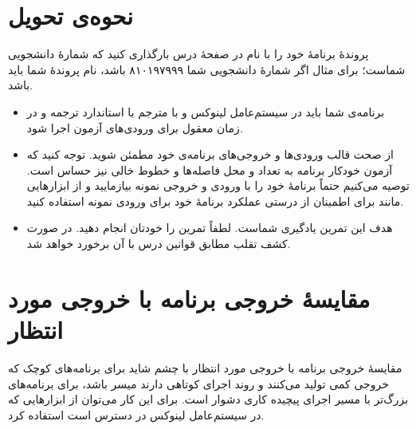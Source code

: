\documentclass{utap}
\begin{document}
    \begin{latin}
    \begin{figure}
    \centering
    {\fontsize{4.4}{4.4} \selectfont
    }
    \end{figure}
    \end{latin}

    \clearpage
    
    \section{نحوه‌ی تحویل}

    پروندهٔ برنامهٔ خود را با نام  در صفحهٔ  درس بارگذاری کنید که  شمارهٔ دانشجویی شماست؛ برای مثال اگر شمارهٔ دانشجویی شما ۸۱۰۱۹۷۹۹۹ باشد، نام پروندهٔ شما باید  باشد.

    \begin{itemize}
        \item برنامه‌ی شما باید در سیستم‌عامل لینوکس و با مترجم  با استاندارد  ترجمه و در زمان معقول برای ورودی‌های آزمون اجرا شود.
        \item از صحت قالب ورودی‌ها و خروجی‌های برنامه‌ی خود مطمئن شوید. توجه کنید که آزمون خودکار برنامه به تعداد و محل فاصله‌ها و خطوط خالی نیز حساس است. توصیه می‌کنیم حتماً برنامهٔ خود را با ورودی و خروجی نمونه بیازمایید و از ابزارهایی مانند  برای اطمینان از درستی عملکرد برنامهٔ خود برای ورودی نمونه استفاده کنید.
        \item هدف این تمرین یادگیری شماست. لطفاً تمرین را خودتان انجام دهید. در صورت کشف تقلب مطابق قوانین درس با آن برخورد خواهد شد.
    \end{itemize}

    \appendix

    \section{مقایسهٔ خروجی برنامه با خروجی مورد انتظار\label{sec:diff}}

    مقایسهٔ خروجی برنامه با خروجی مورد انتظار با چشم شاید برای برنامه‌های کوچک که خروجی کمی تولید می‌کنند و روند اجرای کوتاهی دارند میسر باشد، برای برنامه‌های بزرگ‌تر با مسیر اجرای پیچیده کاری دشوار است. برای این کار می‌توان از ابزارهایی که در سیستم‌عامل لینوکس در دسترس است استفاده کرد.
\end{document}
